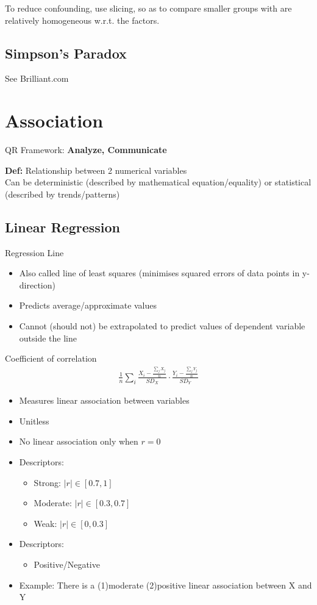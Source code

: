 \documentclass{article}
\begin{document}
To reduce confounding, use slicing, so as to compare smaller groups with are relatively homogeneous w.r.t. the factors.

\subsection{Simpson's Paradox}
See Brilliant.com

\section{Association}
QR Framework: \textbf{Analyze, Communicate}

\textbf{Def:} Relationship between 2 numerical variables\\
Can be deterministic (described by mathematical equation/equality) or statistical (described by trends/patterns)

\subsection{Linear Regression}
Regression Line
\begin{itemize}
	\item Also called line of least squares (minimises squared errors of data points in y-direction)
	\item Predicts average/approximate values
	\item Cannot (should not) be extrapolated to predict values of dependent variable outside the line
\end{itemize}

Coefficient of correlation
\begin{align*}
	\frac{1}{n}\sum_i \frac{X_i-\frac{\sum_j X_j}{n}}{SD_X}\cdot \frac{Y_i-\frac{\sum_j Y_j}{n}}{SD_Y}
\end{align*}

\begin{itemize}
	\item Measures linear association between variables
	\item Unitless
	\item No linear association only when $r=0$
	\item Descriptors:
	\begin{itemize}
		\item Strong: $|r|\in [0.7, 1]$
		\item Moderate: $|r|\in [0.3, 0.7]$
		\item Weak: $|r|\in [0, 0.3]$
	\end{itemize}
	\item Descriptors:
	\begin{itemize}
		\item Positive/Negative
	\end{itemize}
	\item Example: There is a (1)moderate (2)positive linear association between X and Y
\end{itemize}
\end{document}
